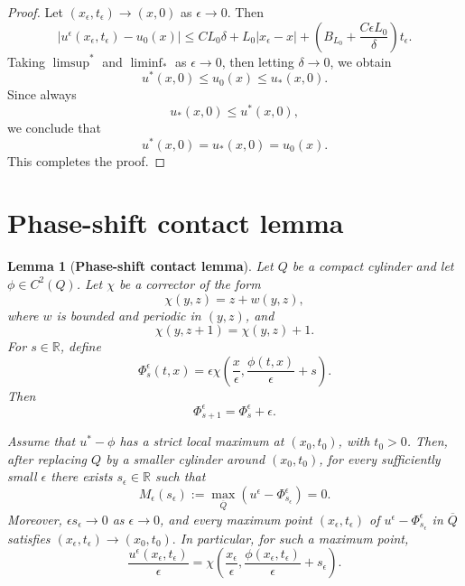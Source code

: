 \documentclass[preprint]{elsarticle}
\newtheorem{lemma}{Lemma}[section]
\numberwithin{equation}{section}
\begin{document}
\begin{proof}
Let $(x_\epsilon,t_\epsilon)\to(x,0)$ as $\epsilon\to0$. Then
\begin{equation*}
|u^\epsilon(x_\epsilon,t_\epsilon)-u_0(x)|
\le
C L_0\delta
+
L_0|x_\epsilon-x|
+
\left(
B_{L_0}
+
\frac{C\epsilon L_0}{\delta}
\right)t_\epsilon.
\end{equation*}
Taking $\limsup^*$ and $\liminf_*$ as $\epsilon\to0$, then letting $\delta\to0$, we obtain
\begin{equation*}
u^*(x,0)\le u_0(x)\le u_*(x,0).
\end{equation*}
Since always
$$
u_*(x,0)\le u^*(x,0),
$$
we conclude that
\begin{equation*}
u^*(x,0)=u_*(x,0)=u_0(x).
\end{equation*}
This completes the proof.
\end{proof}

\section{Phase-shift contact lemma}

\begin{lemma}[\textbf{Phase-shift contact lemma}]
Let $Q$ be a compact cylinder and let $\phi\in C^2(Q)$. Let $\chi$ be a corrector of the form
\begin{equation*}
\chi(y,z)=z+w(y,z),
\end{equation*}
where $w$ is bounded and periodic in $(y,z)$, and
\begin{equation*}
\chi(y,z+1)=\chi(y,z)+1.
\end{equation*}
For $s\in\mathbb R$, define
\begin{equation*}
\Phi_s^\epsilon(t,x)
=
\epsilon
\chi\left(
\frac{x}{\epsilon},
\frac{\phi(t,x)}{\epsilon}+s
\right).
\end{equation*}
Then
\begin{equation*}
\Phi_{s+1}^\epsilon=\Phi_s^\epsilon+\epsilon.
\end{equation*}

Assume that $u^*-\phi$ has a strict local maximum at $(x_0,t_0)$, with $t_0>0$. Then, after replacing $Q$ by a smaller cylinder around $(x_0,t_0)$, for every sufficiently small $\epsilon$ there exists $s_\epsilon\in\mathbb R$ such that
\begin{equation*}
M_\epsilon(s_\epsilon):=
\max_{\overline Q}\left(u^\epsilon-\Phi_{s_\epsilon}^\epsilon\right)=0.
\end{equation*}
Moreover, $\epsilon s_\epsilon\to0$ 
as $\epsilon\to0$, and every maximum point $(x_\epsilon,t_\epsilon)$ of $u^\epsilon-\Phi_{s_\epsilon}^\epsilon$ in $\overline Q$ satisfies $(x_\epsilon,t_\epsilon)\to(x_0,t_0).$
In particular, for such a maximum point,
\begin{equation*}
\frac{u^\epsilon(x_\epsilon,t_\epsilon)}{\epsilon}
=
\chi\left(
\frac{x_\epsilon}{\epsilon},
\frac{\phi(x_\epsilon,t_\epsilon)}{\epsilon}
+s_\epsilon
\right).
\end{equation*}\label{phase-shift contact lemma}
\end{lemma}
\end{document}
